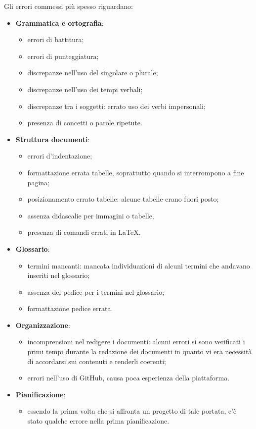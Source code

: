 \documentclass[../piano_di_qualifica.tex]{subfiles}
\begin{document}
Gli errori commessi più spesso riguardano:

\begin{itemize}

	\item \textbf{Grammatica e ortografia}:
	      \begin{itemize}
		      \item errori di battitura;
		      \item errori di punteggiatura;
		      \item discrepanze nell'uso del singolare o plurale;
		      \item discrepanze nell'uso dei tempi verbali;
		      \item discrepanze tra i soggetti: errato uso dei verbi impersonali;
		      \item presenza di concetti o parole ripetute.
	      \end{itemize}

	\item \textbf{Struttura documenti}:
	      \begin{itemize}
		      \item errori d'indentazione;
		      \item formattazione errata tabelle, soprattutto quando si interrompono a fine pagina;
		      \item posizionamento errato tabelle: alcune tabelle erano fuori posto;
		      \item assenza didascalie per immagini o tabelle,
		      \item presenza di comandi errati in \LaTeX.
	      \end{itemize}

	\item \textbf{Glossario}:
	      \begin{itemize}
		      \item termini mancanti: mancata individuazioni di alcuni termini che andavano inseriti nel glossario;
		      \item assenza del pedice per i termini nel glossario;
		      \item formattazione pedice errata.
	      \end{itemize}

	\item \textbf{Organizzazione}:
	      \begin{itemize}
		      \item incomprensioni nel redigere i documenti: alcuni errori si sono verificati i primi tempi durante la redazione dei documenti in quanto vi era necessità di accordarsi sui contenuti e renderli coerenti;
		      \item errori nell'uso di GitHub, causa poca esperienza della piattaforma.
	      \end{itemize}

	\item \textbf{Pianificazione}:
	      \begin{itemize}
		      \item essendo la prima volta che si affronta un progetto di tale portata, c'è stato qualche errore nella prima pianificazione.
	      \end{itemize}

\end{itemize}
\end{document}
